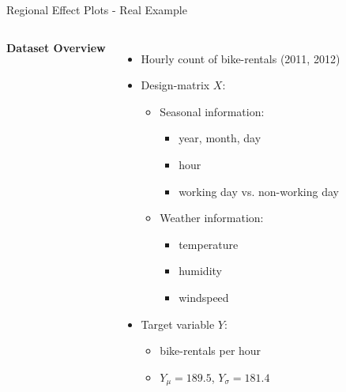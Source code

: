 \documentclass[11pt,compress,t,notes=noshow, aspectratio=169, xcolor=table,dvipsnames]{beamer}
\begin{document}
\begin{frame}{Regional Effect Plots - Real Example}
    \begin{columns}
        \textbf{Dataset Overview}  %
        \vspace{0.5em}  %
        \begin{itemize}
            \item Hourly count of bike-rentals (2011, 2012)
            \item Design-matrix $X$:
            \begin{itemize}
                \item Seasonal information:
                \begin{itemize}
                    \item year, month, day
                    \item hour
                    \item working day vs. non-working day
                \end{itemize}
                \item Weather information:
                \begin{itemize}
                    \item temperature
                    \item humidity
                    \item windspeed
                \end{itemize}
            \end{itemize}
            \item Target variable $Y$:
            \begin{itemize}
                \item bike-rentals per hour
                \item $Y_\mu = 189.5$, $Y_\sigma = 181.4$
            \end{itemize}
        \end{itemize}

\end{columns}
\end{frame}
\end{document}
